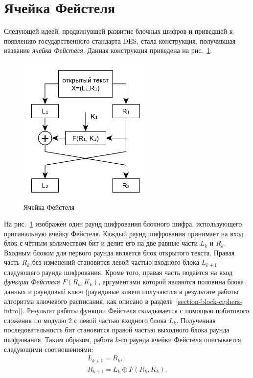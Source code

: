\section{Ячейка Фейстеля}

Следующей идеей, продвинувшей развитие блочных шифров и приведшей к появлению государственного стандарта DES, стала конструкция, получившая название \emph{ячейка Фейстеля}. Данная конструкция приведена на рис.~\ref{fig:Feistel}.

\begin{figure}[!htb]
    \centering
    \includegraphics[width=0.6\textwidth]{pic/feistel}
    \caption{Ячейка Фейстеля\label{fig:Feistel}}
\end{figure}

На рис.~\ref{fig:Feistel} изображён один раунд шифрования блочного шифра, использующего оригинальную ячейку Фейстеля. Каждый раунд шифрования принимает на вход блок с чётным количеством бит и делит его на две равные части $L_k$ и $R_k$. Входным блоком для первого раунда является блок открытого текста. Правая часть $R_k$ без изменений становится левой частью входного блока $L_{k+1}$ следующего раунда шифрования. Кроме того, правая часть подаётся на вход \emph{функции Фейстеля} $F\left(R_k, K_k \right)$, аргументами которой являются половина блока данных и раундовый ключ (раундовые ключи получаются в результате работы алгоритма ключевого расписания, как описано в разделе~\ref{section-block-ciphers-intro}). Результат работы функции Фейстеля складывается с помощью побитового сложения по модулю 2 с левой частью входного блока $L_k$. Полученная последовательность бит становится правой частью выходного блока раунда шифрования. Таким образом, работа $k$-го раунда ячейки Фейстеля описывается следующими соотношениями:
\[\begin{array}{l}
    L_{k+1} = R_{k}, \\
    R_{k+1} = L_{k} \oplus F\left( R_k, K_k \right).
\end{array}\]

